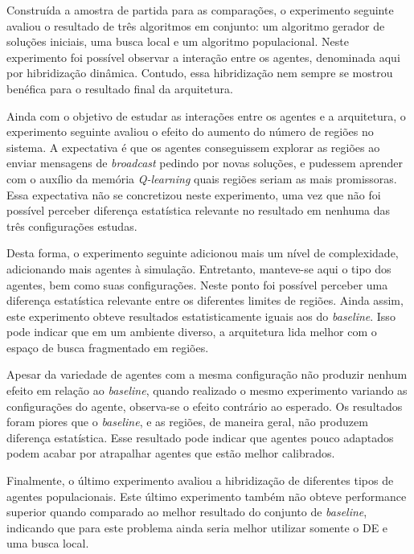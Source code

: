 Construída a amostra de partida para as comparações, o experimento seguinte avaliou o resultado de três algoritmos em conjunto: um algoritmo gerador de soluções iniciais, uma busca local e um algoritmo populacional. Neste experimento foi possível observar a interação entre os agentes, denominada aqui por hibridização dinâmica. Contudo, essa hibridização nem sempre se mostrou benéfica para o resultado final da arquitetura. 

Ainda com o objetivo de estudar as interações entre os agentes e a arquitetura, o experimento seguinte avaliou o efeito do aumento do número de regiões no sistema. A expectativa é que os agentes conseguissem explorar as regiões ao enviar mensagens de \textit{broadcast} pedindo por novas soluções, e pudessem aprender com o auxílio da memória \textit{Q-learning} quais regiões seriam as mais promissoras. Essa expectativa não se concretizou neste experimento, uma vez que não foi possível perceber diferença estatística relevante no resultado em nenhuma das três configurações estudas. 

Desta forma, o experimento seguinte adicionou mais um nível de complexidade, adicionando mais agentes à simulação. Entretanto, manteve-se aqui o tipo dos agentes, bem como suas configurações. Neste ponto foi possível perceber uma diferença estatística relevante entre os diferentes limites de regiões. Ainda assim, este experimento obteve resultados estatisticamente iguais aos do \textit{baseline}. Isso pode indicar que em um ambiente diverso, a arquitetura lida melhor com o espaço de busca fragmentado em regiões. 

Apesar da variedade de agentes com a mesma configuração não produzir nenhum efeito em relação ao \textit{baseline}, quando realizado o mesmo experimento variando as configurações do agente, observa-se o efeito contrário ao esperado. Os resultados foram piores que o \textit{baseline}, e as regiões, de maneira geral, não produzem diferença estatística. Esse resultado pode indicar que agentes pouco adaptados podem acabar por atrapalhar agentes que estão melhor calibrados. 

Finalmente, o último experimento avaliou a hibridização de diferentes tipos de agentes populacionais. Este último experimento também não obteve performance superior quando comparado ao melhor resultado do conjunto de \textit{baseline}, indicando que para este problema ainda seria melhor utilizar somente o DE e uma busca local.

